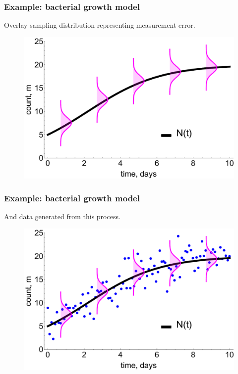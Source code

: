 \documentclass[handout]{beamer}
\begin{document}
\begin{frame}
	\frametitle{Example: bacterial growth model}
	Overlay sampling distribution representing measurement error.
	
	\begin{figure}[ht]
		\centerline{\includegraphics[width=1\textwidth]{figures/lec7_odeSingleBulding2.pdf}}
	\end{figure}
	
\end{frame}

\begin{frame}
	\frametitle{Example: bacterial growth model}
	And data generated from this process.
	
	\begin{figure}[ht]
		\centerline{\includegraphics[width=1\textwidth]{figures/lec7_odeSingleBulding3.pdf}}
	\end{figure}
	
\end{frame}
\end{document}
